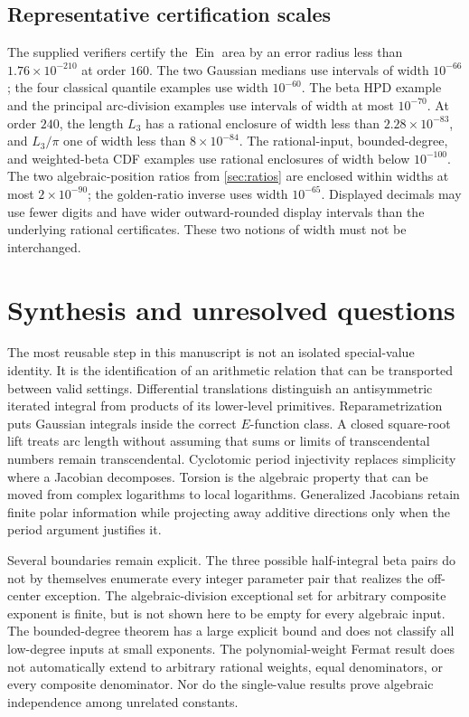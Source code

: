\documentclass[11pt,a4paper]{article}
\numberwithin{equation}{section}
\theoremstyle{definition}
\theoremstyle{remark}
\newcommand{\Ein}{\operatorname{Ein}}
\begin{document}
\subsection{Representative certification scales}
The supplied verifiers certify the $\Ein$ area by an error radius less
than $1.76\times10^{-210}$ at order $160$. The two Gaussian medians use
intervals of width $10^{-66}$; the four classical quantile examples use
width $10^{-60}$. The beta HPD example and the principal arc-division
examples use intervals of width at most $10^{-70}$. At order $240$, the
length $L_3$ has a rational enclosure of width less than
$2.28\times10^{-83}$, and $L_3/\pi$ one of width less than
$8\times10^{-84}$. The rational-input, bounded-degree, and weighted-beta
CDF examples use rational enclosures of width below $10^{-100}$.
The two algebraic-position ratios from \cref{sec:ratios} are enclosed
within widths at most $2\times10^{-90}$; the golden-ratio inverse uses
width $10^{-65}$. Displayed decimals may use fewer digits and have wider
outward-rounded display intervals than the underlying rational
certificates. These two notions of width must not be interchanged.

\section{Synthesis and unresolved questions}\label{sec:conclusion}
The most reusable step in this manuscript is not an isolated special-value
identity. It is the identification of an arithmetic relation that can be
transported between valid settings. Differential translations distinguish
an antisymmetric iterated integral from products of its lower-level
primitives. Reparametrization puts Gaussian integrals inside the correct
$E$-function class. A closed square-root lift treats arc length without
assuming that sums or limits of transcendental numbers remain
transcendental. Cyclotomic period injectivity replaces simplicity where
a Jacobian decomposes. Torsion is the algebraic property that can be moved
from complex logarithms to local logarithms. Generalized Jacobians retain
finite polar information while projecting away additive directions only
when the period argument justifies it.

Several boundaries remain explicit. The three possible half-integral beta
pairs do not by themselves enumerate every integer parameter pair that
realizes the off-center exception. The algebraic-division exceptional set
for arbitrary composite exponent is finite, but is not shown here to be
empty for every algebraic input. The bounded-degree theorem has a large
explicit bound and does not classify all low-degree inputs at small
exponents. The polynomial-weight Fermat result does not automatically
extend to arbitrary rational weights, equal denominators, or every
composite denominator. Nor do the single-value results prove algebraic
independence among unrelated constants.
\end{document}
